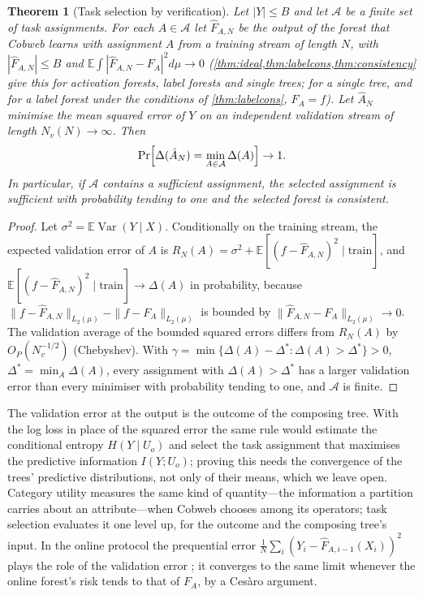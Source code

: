 \documentclass[11pt]{article}
\newtheorem{theorem}{Theorem}
\theoremstyle{definition}
\theoremstyle{remark}
\newcommand{\E}{\mathbb{E}}
\newcommand{\cA}{\mathcal{A}}
\newcommand{\Var}{\operatorname{Var}}
\begin{document}
\begin{theorem}[Task selection by verification]\label{thm:selection}
Let $|Y|\le B$ and let $\cA$ be a finite set of task assignments.  For each $A\in\cA$ let
$\hat F_{A,N}$ be
the output of the forest that Cobweb learns with assignment $A$ from a training stream
of length $N$, with $|\hat F_{A,N}|\le B$ and $\E\int|\hat F_{A,N}-F_A|^2d\mu\to0$
(\cref{thm:ideal,thm:labelcons,thm:consistency} give this for activation forests, label
forests and single trees; for a single tree, and for a label forest under the conditions
of \cref{thm:labelcons}, $F_A=f$).  Let $\hat A_N$ minimise the mean squared error of $Y$ on an
independent validation stream of length $N_v(N)\to\infty$.  Then
\[
  \Pr\Bigl[\Delta(\hat A_N)=\min_{A\in\cA}\Delta(A)\Bigr]\to1.
\]
In particular, if $\cA$ contains a sufficient assignment, the selected assignment is
sufficient with probability tending to one and the selected forest is consistent.
\end{theorem}
\begin{proof}
Let $\sigma^2=\E\Var(Y\mid X)$.  Conditionally on the training stream, the expected
validation error of $A$ is
$R_N(A)=\sigma^2+\E[(f-\hat F_{A,N})^2\mid\text{train}]$, and
$\E[(f-\hat F_{A,N})^2\mid\text{train}]\to\Delta(A)$ in probability, because
$\|f-\hat F_{A,N}\|_{L_2(\mu)}-\|f-F_A\|_{L_2(\mu)}$ is bounded by
$\|\hat F_{A,N}-F_A\|_{L_2(\mu)}\to0$.  The validation average of the bounded squared
errors differs from $R_N(A)$ by $O_P(N_v^{-1/2})$ (Chebyshev).  With
$\gamma=\min\{\Delta(A)-\Delta^*:\Delta(A)>\Delta^*\}>0$, $\Delta^*=\min_A\Delta(A)$,
every assignment with $\Delta(A)>\Delta^*$ has a larger validation error than every
minimiser with probability tending to one, and $\cA$ is finite.
\end{proof}

The validation error at the output is the outcome of the composing tree.  With the log
loss in place of the squared error the same rule would estimate the conditional entropy
$H(Y\mid U_o)$ and select the task assignment that maximises the predictive information
$I(Y;U_o)$; proving this needs the convergence of the trees' predictive distributions,
not only of their means, which we leave open.  Category utility measures the same kind of
quantity---the information a partition carries about an attribute---when Cobweb chooses
among its operators; task selection evaluates it one level up, for the outcome and the
composing tree's input.  In
the online protocol the prequential error $\frac1N\sum_i(Y_i-\hat F_{A,i-1}(X_i))^2$
plays the role of the validation error \citep{dawid1984}; it converges to the same limit
whenever the online forest's risk tends to that of $F_A$, by a Ces\`aro argument.
\end{document}

